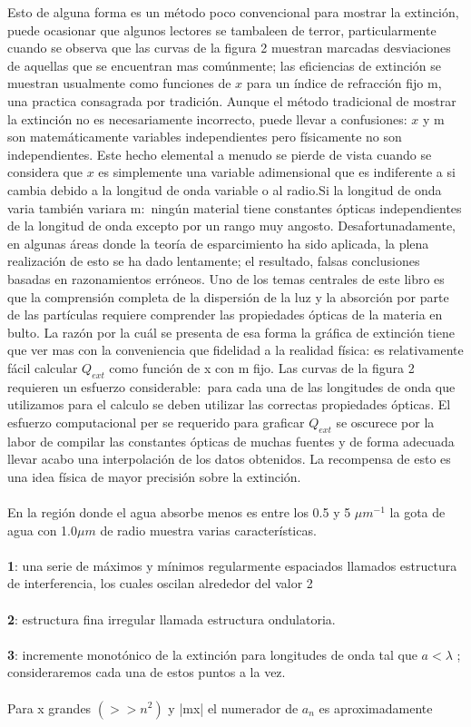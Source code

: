\documentclass[11pt]{article}
\begin{document}
Esto de alguna forma es un método poco convencional para mostrar la extinción, puede ocasionar que algunos lectores se tambaleen de terror, particularmente cuando se observa que las curvas de la figura 2 muestran marcadas desviaciones de aquellas que se encuentran mas comúnmente; las eficiencias de extinción se muestran usualmente como funciones de $x$ para un índice de refracción fijo m, una practica consagrada por tradición.
Aunque el método tradicional de mostrar la extinción no es necesariamente incorrecto, puede llevar a confusiones: $x$ y m son matemáticamente  variables independientes pero físicamente no son independientes. Este hecho elemental a menudo se pierde de vista cuando se considera que $x$ es simplemente una variable adimensional que es indiferente a si cambia debido a la longitud de onda variable o al radio.Si la longitud de onda varia también variara m$:$ ningún material tiene constantes ópticas independientes de la longitud de onda excepto por un rango muy angosto. Desafortunadamente, en algunas áreas donde la teoría de esparcimiento ha sido aplicada, la plena realización de esto se ha dado lentamente; el resultado, falsas conclusiones basadas en razonamientos erróneos.
Uno de los temas centrales de este libro es que la comprensión completa de la dispersión de la luz y la absorción por parte de las partículas requiere comprender las propiedades ópticas de la materia en bulto. La razón por la cuál se presenta de esa forma la gráfica de extinción tiene que ver mas con la conveniencia que fidelidad a la realidad física: es relativamente fácil calcular $Q_{ext}$ como función de x con m fijo. Las curvas de la figura 2 requieren un esfuerzo considerable$:$ para cada una de las longitudes de onda que utilizamos para el calculo se deben utilizar las correctas propiedades ópticas. El esfuerzo computacional per se requerido para graficar $Q_{ext}$ se oscurece por la labor de compilar las constantes ópticas de muchas fuentes y de forma adecuada llevar acabo una interpolación de los datos obtenidos. La recompensa de esto es una idea física de mayor precisión sobre la extinción.
\\ \\ 

En la región donde el agua absorbe menos es entre los 0.5 y 5 $\mu m^{-1}$ la gota de agua con 1.0$\mu m$ de radio muestra varias características. 
\\ \\
\textbf{1}: una serie de máximos y mínimos  regularmente espaciados llamados estructura de interferencia, los cuales oscilan alrededor del valor 2
\\ \\
\textbf{2}: estructura fina irregular llamada estructura ondulatoria.
\\ \\
\textbf{3}: incremente monotónico de la extinción para longitudes de onda tal que $a < \lambda$ ; consideraremos cada una de estos puntos a la vez.
\\ \\
Para x grandes $(>> n^{2})$ y |mx| el numerador de $a_{n}$ es aproximadamente 
\end{document}
